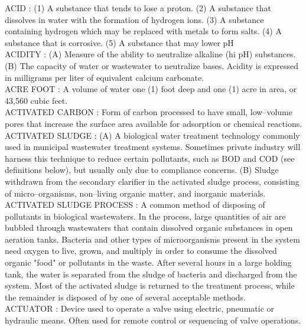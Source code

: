 ACID :  (1)    A substance that tends to lose a proton. (2)     A substance that dissolves in water with the formation of hydrogen ions. (3)    A substance containing hydrogen which may be replaced with metals to form salts. (4)   A substance that is corrosive.  (5)   A substance that may lower pH\\
\vspace{0.15cm}
ACIDITY :  (A) Measure of the ability to neutralize alkaline (hi pH) substances. (B)  The capacity of water or wastewater to neutralize bases. Acidity is expressed in milligrams per liter of equivalent calcium carbonate.\\
\vspace{0.15cm}
ACRE FOOT :  A volume of water one (1) foot deep and one (1) acre in area, or 43,560 cubic feet.\\
\vspace{0.15cm}
ACTIVATED CARBON :  Form of carbon processed to have small, low–volume pores that increase the surface area available for adsorption or chemical reactions.\\
\vspace{0.15cm}
ACTIVATED SLUDGE :   (A) A biological water treatment technology commonly used in municipal wastewater treatment systems. Sometimes private industry will harness this technique to reduce certain pollutants, such as BOD and COD (see definitions below), but usually only due to compliance concerns.  (B) Sludge withdrawn from the secondary clarifier in the activated sludge process, consisting of micro–organisms, non–living organic matter, and inorganic materials.\\
\vspace{0.15cm}
ACTIVATED SLUDGE PROCESS :   A common method of disposing of pollutants in biological wastewaters. In the process, large quantities of air are bubbled through wastewaters that contain dissolved organic substances in open aeration tanks. Bacteria and other types of microorganisms present in the system need oxygen to live, grown, and multiply in order to consume the dissolved organic "food" or pollutants in the waste. After several hours in a large holding tank, the water is separated from the sludge of bacteria and discharged from the system. Most of the activated sludge is returned to the treatment process, while the remainder is disposed of by one of several acceptable methods.\\
\vspace{0.15cm}
ACTUATOR :   Device used to operate a valve using electric, pneumatic or hydraulic means. Often used for remote control or sequencing of valve operations.\\
